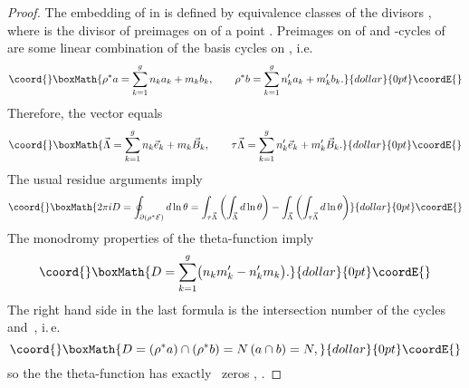 \documentclass[a4paper,11pt]{article}
\providecommand{\p}{\partial}
\providecommand{\cE}{{\cal E}}
\providecommand{\vL}{\Vec{\Lambda}}
\providecommand{\vB}{\Vec{B}}
\theoremstyle{plain}
\theoremstyle{remark}
\begin{document}
\begin{proof}
The embedding of \myHighlight{$\cE$}\coordHE{} in \coordHE{} is defined by equivalence classes
of the divisors \coordHE{}, where \coordHE{} is the divisor of
preimages on \myHighlight{$\Gamma$}\coordHE{} of a point \myHighlight{$z\in\cE$}\coordHE{}.
Preimages on \myHighlight{$\Gamma$}\coordHE{} of \coordHE{} and \coordHE{}-cycles of \coordHE{} are some
linear combination of the basis cycles on \myHighlight{$\Gamma$}\coordHE{}, i.e.
$$\coord{}\boxMath{
\rho^* a=\sum_{k=1}^g n_ka_k + m_k b_k,\qquad
\rho^* b=\sum_{k=1}^g n_k'a_k+ m_k'b_k .
}{dollar}{0pt}\coordE{}$$
Therefore, the vector \myHighlight{$\vL$}\coordHE{} equals
$$\coord{}\boxMath{
\vL=\sum_{k=1}^g n_k \Vec{e}_k+m_k \vB_k,\qquad
\tau \vL=\sum_{k=1}^g n_k' \Vec{e}_k+m_k' \vB_k .
}{dollar}{0pt}\coordE{}$$
The usual residue arguments imply
$$\coord{}\boxMath{
2\pi i D=\oint_{\p (\rho^*\cE)} d\ln \theta=
\int_{\tau \vL}\left(\int_{\vL}d\ln\theta\right)-
\int_{\vL}\left(\int_{\tau \vL}d\ln\theta\right)
}{dollar}{0pt}\coordE{}$$
The monodromy properties of the theta-function imply
$$\coord{}\boxMath{
D=\sum_{k=1}^g \bigl( n_k m_k'-n_k' m_k \bigr).
}{dollar}{0pt}\coordE{}$$
The right hand side in the last formula is the intersection number of
the cycles~\coordHE{} and~\coordHE{}, i.\,e.
$$\coord{}\boxMath{
D=(\rho^*a)\cap (\rho^*b)=N \left(a\cap b\right)=N,
}{dollar}{0pt}\coordE{}$$
so the the theta-function has exactly~\coordHE{} zeros \coordHE{}, \coordHE{}.


\end{proof}
\end{document}
